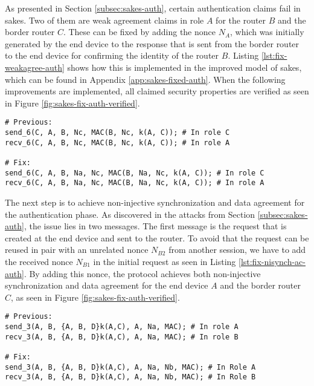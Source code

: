As presented in Section \ref{subsec:sakes-auth}, certain authentication claims fail in \gls{sakes}. Two of them are weak agreement claims in role $A$ for the router $B$ and the border router $C$. These can be fixed by adding the nonce $N_A$, which was initially generated by the end device to the response that is sent from the border router to the end device for confirming the identity of the router $B$. Listing \ref{lst:fix-weakagree-auth} shows how this is implemented in the improved model of \gls{sakes}, which can be found in Appendix \ref{app:sakes-fixed-auth}. When the following improvements are implemented, all claimed security properties are verified as seen in Figure \ref{fig:sakes-fix-auth-verified}.

\newpage

\begin{lstlisting}[caption={Fix to the SAKES protocol to provide weak agreement for the end device in the authentication phase. The changes to the protocol are highlighted with blue.}, label={lst:fix-weakagree-auth}, style=code-improvements-sakes-1]
# Previous:
send_6(C, A, B, Nc, MAC(B, Nc, k(A, C)); # In role C
recv_6(C, A, B, Nc, MAC(B, Nc, k(A, C)); # In role A
	
# Fix:
send_6(C, A, B, Na, Nc, MAC(B, Na, Nc, k(A, C)); # In role C
recv_6(C, A, B, Na, Nc, MAC(B, Na, Nc, k(A, C)); # In role A
\end{lstlisting}

The next step is to achieve non-injective synchronization and data agreement for the authentication phase. As discovered in the attacks from Section \ref{subsec:sakes-auth}, the issue lies in two messages. The first message is the request that is created at the end device and sent to the router. To avoid that the request can be reused in pair with an unrelated nonce $N_{B2}$ from another session, we have to add the received nonce $N_{B1}$ in the initial request as seen in Listing \ref{lst:fix-nisynch-ac-auth}. By adding this nonce, the protocol achieves both non-injective synchronization and data agreement for the end device $A$ and the border router $C$, as seen in Figure \ref{fig:sakes-fix-auth-verified}.\\

\begin{lstlisting}[caption={Fix to the SAKES protocol to provide non-injective synchronization and data agreement for the end device and the border router during the authentication phase. The changes to the protocol are highlighted in blue.}, label={lst:fix-nisynch-ac-auth}, style=code-improvements-sakes-2]
# Previous:
send_3(A, B, {A, B, D}k(A,C), A, Na, MAC); # In role A
recv_3(A, B, {A, B, D}k(A,C), A, Na, MAC); # In role B
	
# Fix:
send_3(A, B, {A, B, D}k(A,C), A, Na, Nb, MAC); # In Role A
recv_3(A, B, {A, B, D}k(A,C), A, Na, Nb, MAC); # In Role B
\end{lstlisting}


